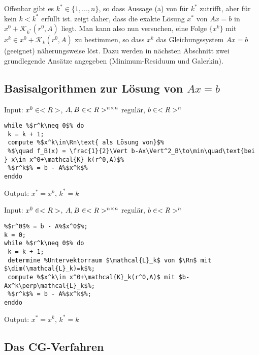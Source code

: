 \begin{remark}
	Offenbar gibt es $k^\ast\in\{1,...,n\}$, so dass Aussage (a) von  für $k^\ast$ zutrifft, aber für kein $k<k^\ast$ erfüllt ist.  zeigt daher, dass die exakte Lösung $x^\ast$ von $Ax=b$ in $x^0 + \mathcal{K}_{k^\ast}(r^0,A)$ liegt. Man kann also nun versuchen, eine Folge $\{x^k\}$ mit $x^k\in x^0 + \mathcal{K}_k(r^0,A)$ zu bestimmen, so dass $x^k$ das Gleichungssystem $Ax=b$ (geeignet) näherungsweise löst. Dazu werden in nächsten Abschnitt zwei grundlegende Ansätze angegeben (Minimum-Residuum und Galerkin).
\end{remark}

\subsection{Basisalgorithmen zur Lösung von $Ax=b$}

\begin{algorithm}
	Input: $x^0\in<R>$, $A,B\in<R>^{n \times n}$ regulär, $b\in<R>^n$
\begin{lstlisting}
while %$r^k\neq 0$% do
 k = k + 1;
 compute %$x^k\in\Rn\text{ als Lösung von}$%
 %$\quad f_B(x) = \frac{1}{2}\Vert b-Ax\Vert^2_B\to\min\quad\text{bei } x\in x^0+\mathcal{K}_k(r^0,A)$%
 %$r^k$% = b - A%$x^k$%
enddo
\end{lstlisting}
	Output: $x^\ast=x^k$, $k^\ast=k$
\end{algorithm}

\begin{algorithm}
	Input: $x^0\in<R>$, $A,B\in<R>^{n \times n}$ regulär, $b\in<R>^n$
	\begin{lstlisting}
%$r^0$% = b - A%$x^0$%;
k = 0;
while %$r^k\neq 0$% do
 k = k + 1;
 determine %Untervektorraum $\mathcal{L}_k$ von $\Rn$ mit $\dim(\mathcal{L}_k)=k$%;
 compute %$x^k\in x^0+\mathcal{K}_k(r^0,A)$ mit $b-Ax^k\perp\mathcal{L}_k$%;
 %$r^k$% = b - A%$x^k$%;
enddo
	\end{lstlisting}
	Output: $x^\ast=x^k$, $k^\ast=k$
\end{algorithm}

\subsection{Das CG-Verfahren}

